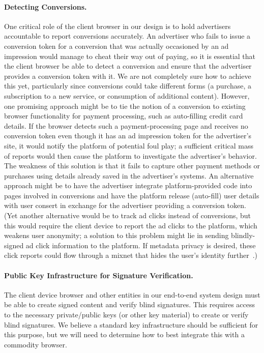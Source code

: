 \paragraph{Detecting Conversions.}
%
One critical role of the client browser in our design is to hold advertisers accountable to report conversions accurately.
%
An advertiser who fails to issue a conversion token for a conversion that was actually occasioned by an ad impression would manage to cheat their way out of paying, so it is essential that the client browser be able to detect a conversion and ensure that the advertiser provides a conversion token with it.
%
We are not completely sure how to achieve this yet, particularly since conversions could take different forms (\eg a purchase, a subscription to a new service, or consumption of additional content).
%
However, one promising approach might be to tie the notion of a conversion to existing browser functionality for payment processing, such as auto-filling credit card details.
%
If the browser detects such a payment-processing page and receives no conversion token even though it has an ad impression token for the advertiser's site, it would notify the platform of potential foul play; a sufficient critical mass of reports would then cause the platform to investigate the advertiser's behavior.
%
The weakness of this solution is that it fails to capture other payment methods or purchases using details already saved in the advertiser's systems.
%
An alternative approach might be to have the advertiser integrate platform-provided code into pages involved in conversions and have the platform release (\ie auto-fill) user details with user consert in exchange for the advertiser providing a conversion token.
%
(Yet another alternative would be to track ad clicks instead of conversions, but this would require the client device to report the ad clicks to the platform, which weakens user anonymity; a solution to this problem might lie in sending blindly-signed ad click information to the platform. If metadata privacy is desired, these click reports could flow through a mixnet that hides the user's identity further~\cite{vuvuzela,tor}.)
%

\paragraph{Public Key Infrastructure for Signature Verification.}
%
The client device browser and other entities in our end-to-end system design must be able to create signed content and verify blind signatures.
%
This requires access to the necessary private/public keys (or other key material) to create or verify blind signatures.
%
We believe a standard key infrastructure should be sufficient for this purpose, but we will need to determine how to best integrate this with a commodity browser.
%

